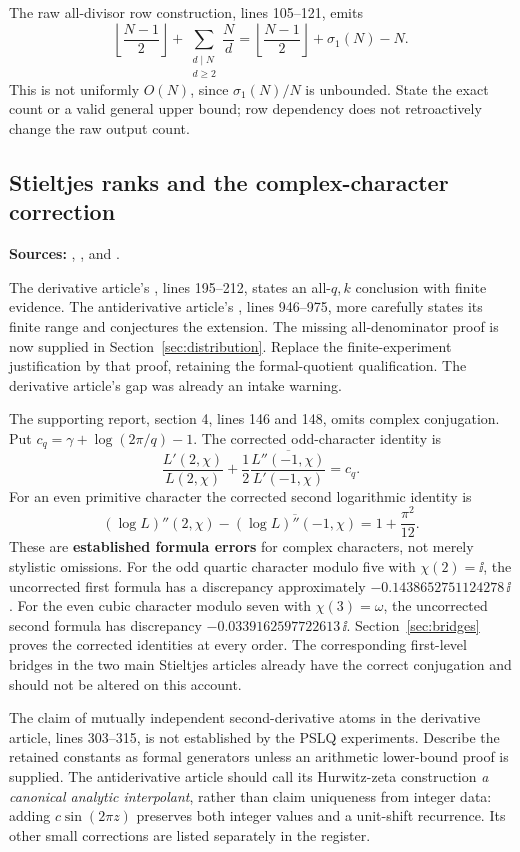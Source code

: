 The raw all-divisor row construction, lines 105--121, emits
\[
\left\lfloor\frac{N-1}{2}\right\rfloor
 +\sum_{\substack{d\mid N\\d\ge2}}\frac Nd
=\left\lfloor\frac{N-1}{2}\right\rfloor+\sigma_1(N)-N.
\]
This is not uniformly \(O(N)\), since \(\sigma_1(N)/N\) is
unbounded. State the exact count or a valid general upper bound;
row dependency does not retroactively change the raw output count.

\subsection{Stieltjes ranks and the complex-character correction}

\noindent\textbf{Sources:}
,
, and
.

The derivative article's , lines 195--212, states
an all-\(q,k\) conclusion with finite evidence.
The antiderivative article's , lines 946--975,
more carefully states its finite range and conjectures the extension.
The missing all-denominator proof is now supplied in
Section~\ref{sec:distribution}. Replace the finite-experiment
justification by that proof, retaining the formal-quotient
qualification. The derivative article's gap was already an
intake warning.

The supporting report, section 4, lines 146 and 148, omits complex
conjugation. Put \(c_q=\gamma+\log(2\pi/q)-1\). The corrected
odd-character identity is
\[
\frac{L'(2,\chi)}{L(2,\chi)}
+\frac12\overline{\frac{L''(-1,\chi)}{L'(-1,\chi)}}=c_q.
\]
For an even primitive character the corrected second logarithmic
identity is
\[
(\log L)''(2,\chi)
-\overline{(\log L)''(-1,\chi)}=1+\frac{\pi^2}{12}.
\]
These are \textbf{established formula errors} for complex
characters, not merely stylistic omissions.
For the odd quartic character modulo five with \(\chi(2)=\ii\),
the uncorrected first formula has a discrepancy approximately
\(-0.1438652751124278\,\ii\).
For the even cubic character modulo seven with
\(\chi(3)=\omega\), the uncorrected second formula has discrepancy
\(-0.0339162597722613\,\ii\).
Section~\ref{sec:bridges} proves the corrected identities at every
order. The corresponding first-level bridges in the two main
Stieltjes articles already have the correct conjugation and should
not be altered on this account.

The claim of mutually independent second-derivative atoms in the
derivative article, lines 303--315, is not established by the PSLQ
experiments. Describe the retained constants as formal generators
unless an arithmetic lower-bound proof is supplied.
The antiderivative article should call its Hurwitz-zeta construction
\emph{a canonical analytic interpolant}, rather than claim uniqueness
from integer data: adding \(c\sin(2\pi z)\) preserves both integer
values and a unit-shift recurrence. Its other small corrections are
listed separately in the register.

